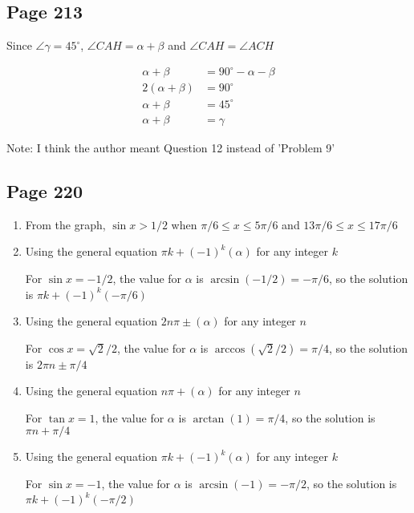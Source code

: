 \documentclass{article}
\newenvironment{solutions}[1]
{\subsection*{#1}
 \begin{enumerate}[leftmargin=1.5em]}
{\end{enumerate}}
\newcommand{\solution}{\item}
\begin{document}
\begin{solutions}{Page 213}
Since $\angle \gamma = 45^{\circ }$, $\angle CAH = \alpha + \beta$ and $\angle CAH = \angle ACH$

\begin{align*}
    \alpha + \beta &= 90^{\circ} -\alpha -\beta\\
    2(\alpha + \beta) &= 90^{\circ}\\
    \alpha + \beta &= 45^{\circ}\\
    \alpha + \beta &= \gamma
\end{align*}



Note: I think the author meant Question 12 instead of 'Problem 9'
\end{solutions}

\begin{solutions}{Page 220}
\solution
From the graph, $\sin x > 1/2$ when $\pi/6 \leq x \leq 5\pi/6$ and $13\pi/6 \leq x \leq 17\pi/6$
\solution
Using the general equation $\pi k + (-1)^k (\alpha)$ for any integer $k$

For $\sin x = -1/2$, the value for $\alpha$ is $\arcsin(-1/2) = -\pi/6$, so the solution is $\pi k + (-1)^k (-\pi/6)$
\solution
Using the general equation $2n\pi \pm (\alpha)$ for any integer $n$

For $\cos x = \sqrt{2}/2$, the value for $\alpha$ is $\arccos(\sqrt{2}/2) = \pi/4$, so the solution is $2\pi n \pm \pi/4$
\solution
Using the general equation $n\pi + (\alpha)$ for any integer $n$

For $\tan x = 1$, the value for $\alpha$ is $\arctan(1) = \pi/4$, so the solution is $\pi n + \pi/4$
\solution
Using the general equation $\pi k + (-1)^k (\alpha)$ for any integer $k$

For $\sin x = -1$, the value for $\alpha$ is $\arcsin(-1) = -\pi/2$, so the solution is $\pi k + (-1)^k (-\pi/2)$
\end{solutions}
\end{document}
